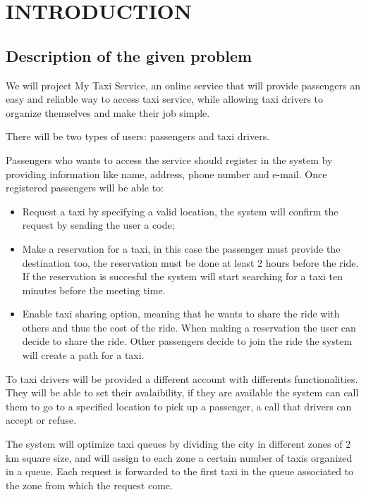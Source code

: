 
\section{INTRODUCTION}
\subsection{Description of the given problem}

We will project My Taxi Service, an online service that will provide passengers an easy and reliable way to access taxi service, while allowing taxi drivers to organize themselves and make their job simple.

There will be two types of users: passengers and taxi drivers.

Passengers who wants to access the service should register in the system by providing information like name, address, phone number and e-mail. 
Once registered passengers will be able to: 
\begin{itemize}
	\item Request a taxi by specifying a valid location, the system will confirm the request by sending the user a code;
	\item Make a reservation for a taxi, in this case the passenger must provide the destination too, the reservation must be done at least 2 hours before the ride. If the reservation is succesful the system will start searching for a taxi ten minutes before the meeting time.
	\item Enable taxi sharing option, meaning that he wants to share the ride with others and thus the cost of the ride. When making a reservation the user can decide to share the ride. Other passengers decide to join the ride the system will create a path for a taxi.
\end{itemize}

To taxi drivers will be provided a different account with differents functionalities. They will be able to set their avalaibility, if they are available the system can call them to go to a specified location to pick up a passenger, a call that drivers can accept or refuse.

The system will optimize taxi queues by dividing the city in different zones of 2 km square size, and will assign to each zone a certain number of taxis organized in a queue. Each request is forwarded to the first taxi in the queue associated to the zone from which the request come.

